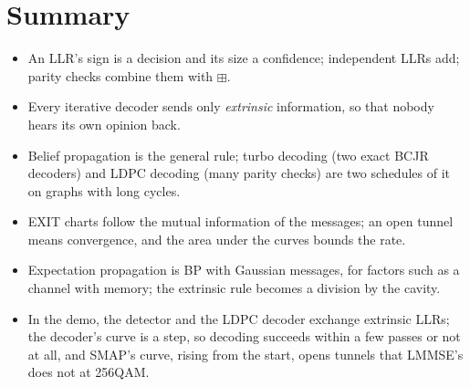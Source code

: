 \documentclass[11pt,a4paper]{article}
\theoremstyle{definition}
\theoremstyle{remark}
\begin{document}
\section{Summary}

\begin{itemize}[leftmargin=*]
  \item An LLR's sign is a decision and its size a confidence; independent LLRs add; parity checks combine them with $\boxplus$.
  \item Every iterative decoder sends only \emph{extrinsic} information, so that nobody hears its own opinion back.
  \item Belief propagation is the general rule; turbo decoding (two exact BCJR decoders) and LDPC decoding (many parity checks) are two schedules of it on graphs with long cycles.
  \item EXIT charts follow the mutual information of the messages; an open tunnel means convergence, and the area under the curves bounds the rate.
  \item Expectation propagation is BP with Gaussian messages, for factors such as a channel with memory; the extrinsic rule becomes a division by the cavity.
  \item In the demo, the detector and the LDPC decoder exchange extrinsic LLRs; the decoder's curve is a step, so decoding succeeds within a few passes or not at all, and SMAP's curve, rising from the start, opens tunnels that LMMSE's does not at 256QAM.
\end{itemize}
\end{document}
